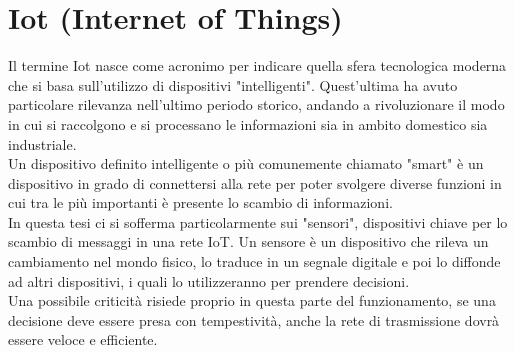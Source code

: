 \documentclass[12pt,a4paper,twoside]{report}
\begin{document}
	\section{Iot (Internet of Things)}    
	\vspace{-0.3cm}          
	Il termine Iot nasce come acronimo per indicare quella sfera tecnologica moderna che si basa sull'utilizzo di dispositivi "intelligenti". Quest'ultima ha avuto particolare rilevanza nell'ultimo periodo storico, andando a rivoluzionare il modo in cui si raccolgono e si processano le informazioni sia in ambito domestico sia industriale. \smallskip \\
	Un dispositivo definito intelligente o più comunemente chiamato "smart" è un dispositivo in grado di connettersi alla rete per poter svolgere diverse funzioni in cui tra le più importanti è presente lo scambio di informazioni. \smallskip \\
	In questa tesi ci si sofferma particolarmente sui "sensori", dispositivi chiave per lo scambio di messaggi in una rete IoT.
	Un sensore è un dispositivo che rileva un cambiamento nel mondo fisico, lo traduce in un segnale digitale e poi lo diffonde ad altri dispositivi, i quali lo utilizzeranno per prendere decisioni. \smallskip \\
	Una possibile criticità risiede proprio in questa parte del funzionamento, se una decisione deve essere presa con tempestività, anche la rete di trasmissione dovrà essere veloce e efficiente.
	\vspace{-0.5cm}
\end{document}
